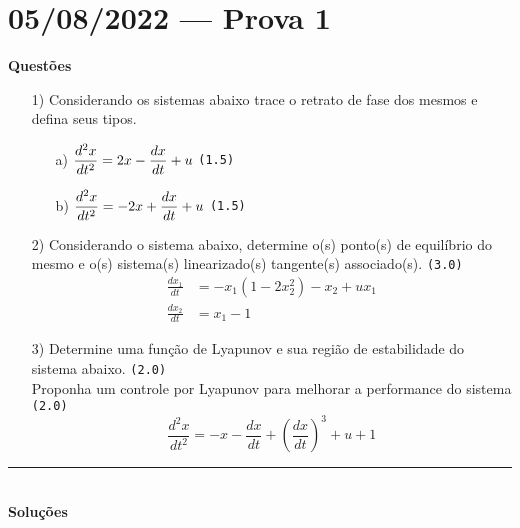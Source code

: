 \section*{05/08/2022 --- Prova 1}
%	
	\textbf{\sffamily Questões}
	\begin{enumerate}
		\item [1)]
		Considerando os sistemas abaixo trace o retrato de fase dos mesmos e defina seus tipos.
		\begin{itemize}
			\item [a)] 
			$\displaystyle \frac{d^2 x}{dt^2} = 2x - \frac{dx}{dt} + u$
			{\hfill \tt (1.5)}
			
			\item [b)]			
			$\displaystyle \frac{d^2 x}{dt^2} = -2x + \frac{dx}{dt} + u$
			{\hfill \tt (1.5)}
		\end{itemize}
		
		\item [2)]
		Considerando o sistema abaixo, determine o(s) ponto(s) de equilíbrio do mesmo e o(s) sistema(s) linearizado(s) tangente(s) associado(s).
		{\hfill \tt (3.0)}
		\begin{align*}
			\frac{dx_1}{dt} &= -x_1(1-2x_2^2) - x_2 + ux_1 \\
			\frac{dx_2}{dt} &= x_1 - 1
		\end{align*}
		
		\item [3)]
		Determine uma função de Lyapunov e sua região de estabilidade do sistema abaixo. 
		{\hfill \tt (2.0)} \\
		Proponha um controle por Lyapunov para melhorar a performance do sistema 
		{\hfill \tt (2.0)}
		\[
			\frac{d^2x}{dt^2} = -x - \frac{dx}{dt} + 
			                    \left(\frac{dx}{dt}\right)^3 + u + 1
		\]	
	\end{enumerate}
	\rule{\textwidth}{0.5pt} \\
	\textbf{\sffamily Soluções}
